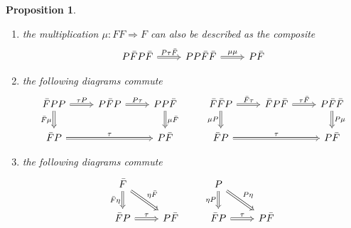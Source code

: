 \documentclass[a4paper,10pt
,draft
]{article}%
\numberwithin{equation}{section}
\numberwithin{figure}{section}
\newtheorem{proposition}[equation]{Proposition}%
\theoremstyle{definition} %
\newcommand{\1}{\ensuremath{\mathbbm 1}}%
\begin{document}
\begin{proposition}\label{ALTMULT PROP}
\begin{enumerate}[label=(\roman*)]
\item
the multiplication
$\mu \colon FF \Rightarrow F$ 
can also be described as the composite
\begin{equation}\label{ALTMULT EQ}
\begin{tikzcd}
	P \bar{F} P \bar{F} \ar[Rightarrow]{r}{P \tau \bar{F}}
&
	P P \bar{F} \bar{F}   \ar[Rightarrow]{r}{\mu \mu}
&
	P \bar{F} 
\end{tikzcd}
\end{equation}
\item
the following diagrams commute
\begin{equation}\label{DOUBLETWIST EQ}
\begin{tikzcd}
	\bar{F} P P \ar[Rightarrow]{r}{\tau P} 
	\ar[Rightarrow]{d}[swap]{\bar{F} \mu}
&
	P \bar{F} P \ar[Rightarrow]{r}{P\tau}
&
	P P \bar{F} \ar[Rightarrow]{d}{\mu \bar{F}}
&%
	\bar{F} \bar{F} P  \ar[Rightarrow]{r}{\bar{F} \tau}
	\ar[Rightarrow]{d}[swap]{\mu P}
&
	\bar{F} P \bar{F}  \ar[Rightarrow]{r}{\tau \bar{F}}
&
	P \bar{F} \bar{F} \ar[Rightarrow]{d}{P \mu}
\\
	\bar{F} P \ar[Rightarrow]{rr}{\tau} 
&&
	P \bar{F}
&%
	\bar{F} P \ar[Rightarrow]{rr}{\tau} 
&&
	P \bar{F}
\end{tikzcd}
\end{equation}
\item
the following diagrams commute
\begin{equation}\label{UNITTWIST EQ}
\begin{tikzcd}
	\bar{F} \ar[Rightarrow]{d}[swap]{\bar{F} \eta}
	\ar[Rightarrow]{rd}{\eta \bar{F}}
&
&%
	P \ar[Rightarrow]{d}[swap]{\eta P}
	\ar[Rightarrow]{rd}{P \eta}
&
\\
	\bar{F} P \ar[Rightarrow]{r}{\tau} 
&
	P \bar{F}
&%
	\bar{F} P \ar[Rightarrow]{r}{\tau} 
&
	P \bar{F}
\end{tikzcd}
\end{equation}
\end{enumerate}
\end{proposition}
\end{document}
